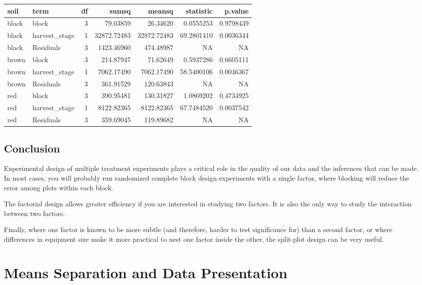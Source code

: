 \documentclass[
]{book}
\begin{document}
\begin{tabular}{l|l|r|r|r|r|r}
\hline
soil & term & df & sumsq & meansq & statistic & p.value\\
\hline
black & block & 3 & 79.03859 & 26.34620 & 0.0555253 & 0.9798439\\
\hline
black & harvest\_stage & 1 & 32872.72483 & 32872.72483 & 69.2801410 & 0.0036344\\
\hline
black & Residuals & 3 & 1423.46960 & 474.48987 & NA & NA\\
\hline
brown & block & 3 & 214.87947 & 71.62649 & 0.5937286 & 0.6605111\\
\hline
brown & harvest\_stage & 1 & 7062.17490 & 7062.17490 & 58.5400106 & 0.0046367\\
\hline
brown & Residuals & 3 & 361.91529 & 120.63843 & NA & NA\\
\hline
red & block & 3 & 390.95481 & 130.31827 & 1.0869202 & 0.4734925\\
\hline
red & harvest\_stage & 1 & 8122.82365 & 8122.82365 & 67.7484520 & 0.0037542\\
\hline
red & Residuals & 3 & 359.69045 & 119.89682 & NA & NA\\
\hline
\end{tabular}

\hypertarget{conclusion-1}{%
\section{Conclusion}\label{conclusion-1}}

Experimental design of multiple treatment experiments plays a critical role in the quality of our data and the inferences that can be made. In most cases, you will probably run randomized complete block design experiments with a single factor, where blocking will reduce the error among plots within each block.

The factorial design allows greater efficiency if you are interested in studying two factors. It is also the only way to study the interaction between two factors.

Finally, where one factor is known to be more subtle (and therefore, harder to test significance for) than a second factor, or where differences in equipment size make it more practical to nest one factor inside the other, the split-plot design can be very useful.

\hypertarget{means-separation-and-data-presentation}{%
\chapter{Means Separation and Data Presentation}\label{means-separation-and-data-presentation}}
\end{document}
